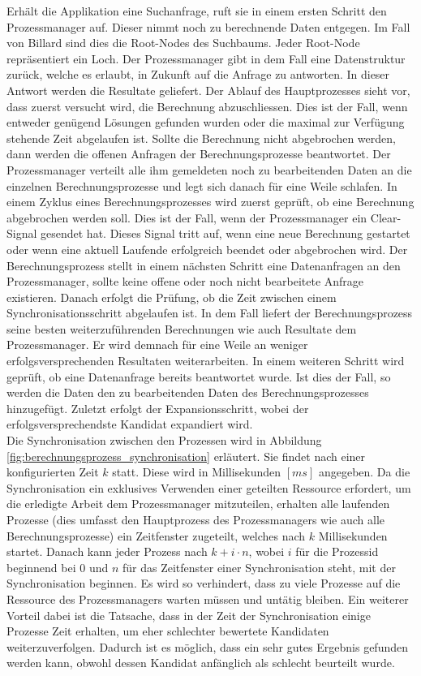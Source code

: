 Erhält die Applikation eine Suchanfrage, ruft sie in einem ersten Schritt den Prozessmanager auf.
Dieser nimmt noch zu berechnende Daten entgegen. Im Fall von Billard sind dies die Root-Nodes des Suchbaums.
Jeder Root-Node repräsentiert ein Loch. Der Prozessmanager gibt in dem Fall eine Datenstruktur zurück, welche es erlaubt,
in Zukunft auf die Anfrage zu antworten. In dieser Antwort werden die Resultate geliefert. Der Ablauf des Hauptprozesses
sieht vor, dass zuerst versucht wird, die Berechnung abzuschliessen. Dies ist der Fall, wenn entweder genügend Lösungen
gefunden wurden oder die maximal zur Verfügung stehende Zeit abgelaufen ist. Sollte die Berechnung nicht abgebrochen
werden, dann werden die offenen Anfragen der Berechnungsprozesse beantwortet. Der Prozessmanager verteilt alle ihm
gemeldeten noch zu bearbeitenden Daten an die einzelnen Berechnungsprozesse und legt sich danach für eine Weile schlafen.
In einem Zyklus eines Berechnungsprozesses wird zuerst geprüft, ob eine Berechnung abgebrochen werden soll. Dies ist der
Fall, wenn der Prozessmanager ein \glqq Clear-Signal\grqq{} gesendet hat. Dieses Signal tritt auf, wenn eine neue
Berechnung gestartet oder wenn eine aktuell Laufende erfolgreich beendet oder abgebrochen wird.
Der Berechnungsprozess stellt in einem nächsten Schritt eine Datenanfragen an den Prozessmanager, sollte keine offene oder
noch nicht bearbeitete Anfrage existieren. Danach erfolgt die Prüfung, ob die Zeit zwischen einem Synchronisationsschritt
abgelaufen ist. In dem Fall liefert der Berechnungsprozess seine besten weiterzuführenden Berechnungen wie auch Resultate
dem Prozessmanager. Er wird demnach für eine Weile an weniger erfolgsversprechenden Resultaten weiterarbeiten. In einem
weiteren Schritt wird geprüft, ob eine Datenanfrage bereits beantwortet wurde. Ist dies der Fall, so werden die
Daten den zu bearbeitenden Daten des Berechnungsprozesses hinzugefügt. Zuletzt erfolgt der Expansionsschritt, wobei der
erfolgsversprechendste Kandidat expandiert wird.
\\

Die Synchronisation zwischen den Prozessen wird in Abbildung \ref{fig:berechnungsprozess_synchronisation} erläutert.
Sie findet nach einer konfigurierten Zeit $k$ statt. Diese wird in Millisekunden $[ms]$
angegeben. Da die Synchronisation ein exklusives Verwenden einer geteilten Ressource erfordert, um die erledigte Arbeit
dem Prozessmanager mitzuteilen, erhalten alle laufenden Prozesse (dies umfasst den Hauptprozess des Prozessmanagers wie auch
alle Berechnungsprozesse) ein Zeitfenster zugeteilt, welches nach $k$ Millisekunden startet. Danach kann jeder Prozess nach
$k + i \cdot n$, wobei $i$ für die Prozessid beginnend bei $0$ und $n$ für das Zeitfenster einer Synchronisation steht,
mit der Synchronisation beginnen. Es wird so verhindert, dass zu viele Prozesse auf die Ressource des Prozessmanagers
warten müssen und untätig bleiben. Ein weiterer Vorteil dabei ist die Tatsache, dass in der Zeit der Synchronisation
einige Prozesse Zeit erhalten, um eher schlechter bewertete Kandidaten weiterzuverfolgen. Dadurch ist es möglich,
dass ein sehr gutes Ergebnis gefunden werden kann, obwohl dessen Kandidat anfänglich als schlecht beurteilt wurde.

